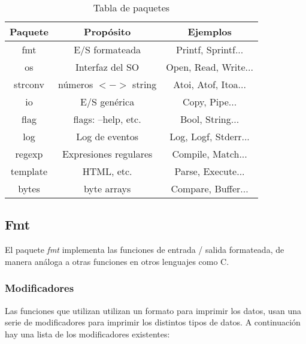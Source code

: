 \begin{table}[htb] \begin{center} \begin{tabular}{|c|c|c|} \hline
\textbf{Paquete} & \textbf{Propósito} & \textbf{Ejemplos}\\ \hline fmt & E/S
formateada & Printf, Sprintf...\\ os & Interfaz del SO & Open, Read, Write...\\
strconv & números $<->$ string & Atoi, Atof, Itoa...\\ io & E/S genérica & Copy,
Pipe...\\ flag & flags: --help, etc. & Bool, String...\\ log & Log de eventos
& Log, Logf, Stderr...\\ regexp & Expresiones regulares & Compile, Match...\\
template & HTML, etc. & Parse, Execute...\\ bytes & byte arrays & Compare,
Buffer...\\ \hline \end{tabular} \end{center} \caption{Tabla de paquetes}
\end{table}

	\subsection{Fmt}
	
	El paquete \textit{fmt} implementa las funciones de entrada / salida
	formateada, de manera análoga a otras funciones en otros lenguajes como C.
	
		\subsubsection{Modificadores}
	
		Las funciones que utilizan utilizan un formato para imprimir los datos,
		usan una serie de modificadores para imprimir los distintos tipos de
		datos. A continuación hay una lista de los modificadores existentes:
	
